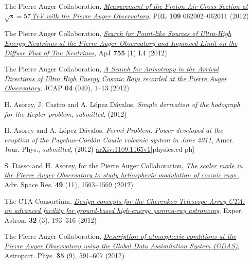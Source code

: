 \begin{etaremune}
\item {}The Pierre Auger Collaboration,
\href{http://dx.doi.org/10.1103/PhysRevLett.109.062002}{\emph{Measurement of
the Proton-Air Cross Section at $\sqrt{s}=57$\,TeV with the Pierre Auger
Observatory}}, PRL {\bf{109}} 062002--062011 (2012)

\item {}The Pierre Auger Collaboration,
\href{http://dx.doi.org/10.1088/2041-8205/755/1/L4}{\emph{Search for Point-like
Sources of Ultra-High Energy Neutrinos at the Pierre Auger Observatory and
Improved Limit on the Diffuse Flux of Tau Neutrinos}}, ApJ {\bf{755}} (1) L4
(2012)

\item {}The Pierre Auger Collaboration, 
\href{http://dx.doi.org/10.1088/1475-7516/2012/04/040}{\emph{A Search for
Anisotropy in the Arrival Directions of Ultra High Energy Cosmic Rays recorded
at the Pierre Auger Observatory}}, JCAP {\bf{04}} (040), 1--13 (2012)

\item {}H. Asorey, J. Castro and A. López Dávalos, {\emph{Simple
derivation of the hodograph for the Kepler problem}}, {\emph{submitted}},
(2012) 

\item {}H. Asorey and A. López Dávalos, {\emph{Fermi Problem: Power
developed at the eruption of the Puyehue-Cordón Caulle volcanic system in June
2011}}, Amer. Jour. Phys., {\emph{submitted}}, (2012)
\href{http://arxiv.org/abs/1109.1165}{arXiv:1109.1165v1}[physics.ed-ph]

\item {}S. Dasso and H. Asorey, for the Pierre Auger Collaboration,
\href{http://dx.doi.org/10.1016/j.asr.2011.12.028}{\emph{ The scaler mode in
the Pierre Auger Observatory to study heliospheric modulation of cosmic rays
}}, Adv. Space Res. {\bf{49}} (11), 1563--1569 (2012)

\item {}The CTA Consortium,
\href{http://dx.doi.org/10.1007/s10686-011-9247-0}{\emph{Design concepts for
the Cherenkov Telescope Array CTA: an advanced facility for ground-based
high-energy gamma-ray astronomy}}, Exper. Astron. {\bf{32}} (3), 193--316
(2012)

\item {}The Pierre Auger Collaboration, 
\href{http://dx.doi.org/10.1016/j.astropartphys.2011.12.002}{\emph{Description
of atmospheric conditions at the Pierre Auger Observatory using the Global Data
Assimilation System (GDAS)}}, Astropart. Phys. {\bf{35}} (9), 591--607 (2012)


\end{etaremune}

